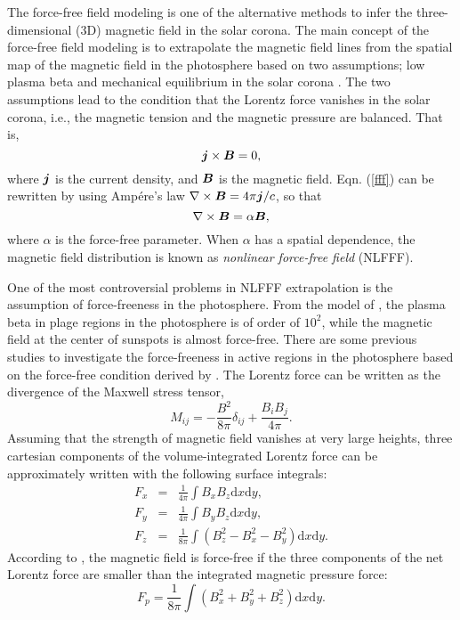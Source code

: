 \documentclass[manuscript]{aastex61}
\def\vector#1{\mbox{\boldmath $#1$}}
\begin{document}
The force-free field modeling is one of the alternative methods to infer the three-dimensional (3D)
magnetic field in the solar corona. The main concept of the force-free field
modeling is to extrapolate the magnetic field lines from the spatial map of
the magnetic field in the photosphere  based on two assumptions; low plasma beta
and mechanical equilibrium in the solar corona  \citep{2012LRSP....9....5W}. The
two assumptions lead to the condition that the Lorentz force vanishes in the
solar corona, i.e., the magnetic tension and the magnetic pressure are balanced.
That is,
\begin{equation}
\vector{j}\times\vector{B}=0,
\label{fff}
\end{equation}
where $\vector{j}$ is the current density, and $\vector{B}$ is the magnetic
field. Eqn. (\ref{fff}) can be rewritten by using Amp\'ere's law
$\nabla\times\vector{B}=4\pi \vector{j}/c$, so that
\begin{equation}
\nabla\times\vector{B}=\alpha\vector{B},
\end{equation}
where $\alpha$ is the force-free parameter. When $\alpha$ has a spatial
dependence, the magnetic field distribution is known as \emph{nonlinear force-free field}
(NLFFF).

One of the most controversial problems in NLFFF extrapolation is the assumption of force-freeness in the photosphere.
From the model of \cite{2001SoPh..203...71G}, the plasma beta in plage
regions in the photosphere is of order of $10^2$, while the magnetic field at the
center of sunspots is
almost force-free. There are some previous studies to investigate the force-freeness
in active regions in the photosphere based on the 
force-free condition derived by \cite{1985svmf.nasa...49L}. The Lorentz force
can be written as the divergence of the Maxwell stress tensor, 
\begin{equation}
M_{ij}=-\frac{B^2}{8\pi} \delta_{ij}+\frac{B_{i}B_{j}}{4\pi}.
\end{equation}
Assuming that the strength of magnetic field vanishes at very large heights, three cartesian components of the volume-integrated Lorentz force can be approximately 
written with the following surface integrals:
\begin{eqnarray}
F_x&=&\frac{1}{4\pi}\int B_{x}B_{z} \textrm{d}x \textrm{d}y , \label{fx}\\
F_y&=&\frac{1}{4\pi}\int B_{y}B_{z} \textrm{d}x \textrm{d}y ,  \label{fy}\\
F_z&=&\frac{1}{8\pi}\int (B_{z}^2-B_{x}^2-B_{y}^2) \textrm{d}x \textrm{d}y.  \label{fz}
\end{eqnarray}
According to \cite{1985svmf.nasa...49L}, the magnetic field is
force-free if the three components of the net Lorentz force are 
smaller than the integrated magnetic pressure force:
\begin{equation}
F_{p}=\frac{1}{8\pi}\int (B_{x}^2+B_{y}^2+B_{z}^2) \textrm{d}x \textrm{d}y. \label{fp}
\end{equation}
\end{document}
